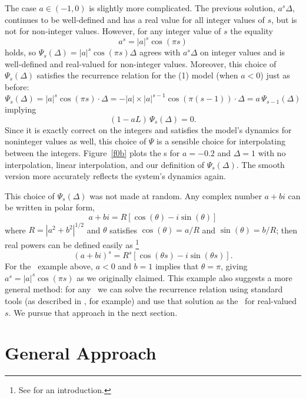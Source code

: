 \documentclass[12pt,fleqn]{article}
\newcommand{\AR}{\allcaps{AR}}
\begin{document}
The case $a \in (-1, 0)$ is slightly more complicated.  The
previous solution, $a^s \Delta$, continues to be well-defined and has a real value
for all integer values of $s$, but is not for non-integer
values. However, for any integer value of $s$ the equality
\begin{equation*}
  a^s = |a|^s \cos(\pi s)
\end{equation*}
holds, so $\Psi_s(\Delta) = |a|^s \cos(\pi s) \Delta$ agrees with $a^s
\Delta$ on integer values and is well-defined and real-valued for
non-integer values. Moreover, this choice of $\Psi_s(\Delta)$
satisfies the recurrence relation for the \AR(1) model (when $a < 0$)
just as before:
\begin{equation*}
  \Psi_s(\Delta) = |a|^s \cos(\pi s) \cdot \Delta = - |a| \times |a|^{s-1} \cos(\pi (s-1)) \cdot \Delta = a \, \Psi_{s-1}(\Delta)
\end{equation*}
implying
\begin{equation*}
  (1 - a L) \, \Psi_s(\Delta) = 0.
\end{equation*}
Since it is exactly correct on the integers and satisfies the model's
dynamics for noninteger values as well, this choice of $\Psi$ is a
sensible choice for interpolating between the
integers. Figure~\ref{f0b} plots the \IRF s for $a = -0.2$ and $\Delta
= 1$ with no interpolation, linear interpolation, and our definition
of $\Psi_s(\Delta)$. The smooth version more accurately reflects the
system's dynamics again.

This choice of $\Psi_s(\Delta)$ was not made at random. Any complex
number $a + bi$ can be written in polar form,
\[
a + bi = R [\cos(\theta) - i \sin(\theta)]
\]
where $R = |a^2 + b^2|^{1/2}$ and $\theta$ satisfies $\cos(\theta) = a/R$ and
$\sin(\theta) = b/R$; then real powers can be defined easily as%
\footnote{See \citet{Ham:94} for an introduction.} %
\[
(a + bi)^s = R^s [\cos(\theta s) - i \sin(\theta s)].
\]
For the \AR\ example above, $a < 0$ and $b = 1$ implies that $\theta =
\pi$, giving $a^s = |a|^s \cos(\pi s)$ as we originally claimed. This
example also suggests a more general method: for any \VAR\ we can
solve the recurrence relation using standard tools (as described in
\citealp{Ham:94}, for example) and use that solution as the \IRF\ for
real-valued $s$. We pursue that approach in the next section.

\section{General Approach}\label{recommended}
\end{document}
